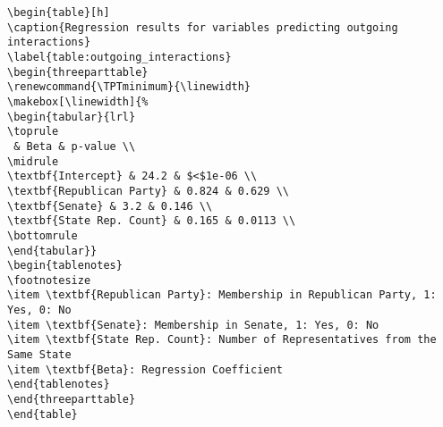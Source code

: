 \documentclass[11pt]{article}
\begin{document}
\begin{Verbatim}[tabsize=4]
\begin{table}[h]
\caption{Regression results for variables predicting outgoing interactions}
\label{table:outgoing_interactions}
\begin{threeparttable}
\renewcommand{\TPTminimum}{\linewidth}
\makebox[\linewidth]{%
\begin{tabular}{lrl}
\toprule
 & Beta & p-value \\
\midrule
\textbf{Intercept} & 24.2 & $<$1e-06 \\
\textbf{Republican Party} & 0.824 & 0.629 \\
\textbf{Senate} & 3.2 & 0.146 \\
\textbf{State Rep. Count} & 0.165 & 0.0113 \\
\bottomrule
\end{tabular}}
\begin{tablenotes}
\footnotesize
\item \textbf{Republican Party}: Membership in Republican Party, 1: Yes, 0: No
\item \textbf{Senate}: Membership in Senate, 1: Yes, 0: No
\item \textbf{State Rep. Count}: Number of Representatives from the Same State
\item \textbf{Beta}: Regression Coefficient
\end{tablenotes}
\end{threeparttable}
\end{table}

\end{Verbatim}




\end{document}
